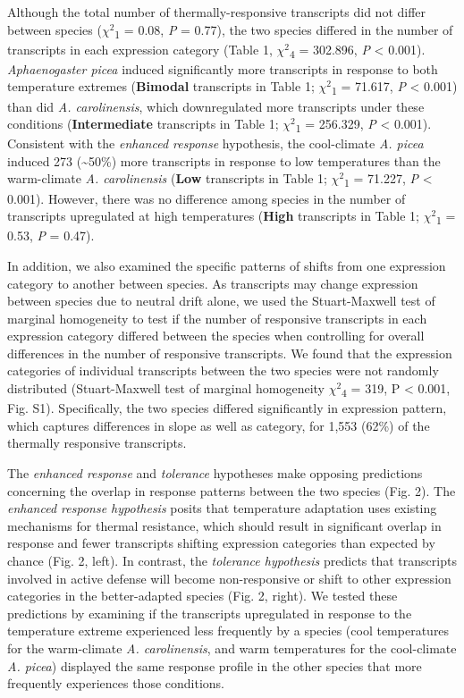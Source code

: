 \documentclass[]{article}
\begin{document}
Although the total number of thermally-responsive transcripts did not
differ between species (\(\chi^2\)\textsubscript{1} = 0.08, \emph{P} =
0.77), the two species differed in the number of transcripts in each
expression category (Table 1, \(\chi^2\)\textsubscript{4} = 302.896,
\emph{P} \textless{} 0.001). \emph{Aphaenogaster picea} induced
significantly more transcripts in response to both temperature extremes
(\textbf{Bimodal} transcripts in Table 1; \(\chi^2\)\textsubscript{1} =
71.617, \emph{P} \textless{} 0.001) than did \emph{A. carolinensis},
which downregulated more transcripts under these conditions
(\textbf{Intermediate} transcripts in Table 1;
\(\chi^2\)\textsubscript{1} = 256.329, \emph{P} \textless{} 0.001).
Consistent with the \emph{enhanced response} hypothesis, the
cool-climate \emph{A. picea} induced 273 (\textasciitilde{}50\%) more
transcripts in response to low temperatures than the warm-climate
\emph{A. carolinensis} (\textbf{Low} transcripts in Table 1;
\(\chi^2\)\textsubscript{1} = 71.227, \emph{P} \textless{} 0.001).
However, there was no difference among species in the number of
transcripts upregulated at high temperatures (\textbf{High} transcripts
in Table 1; \(\chi^2\)\textsubscript{1} = 0.53, \emph{P} = 0.47).

In addition, we also examined the specific patterns of shifts from one
expression category to another between species. As transcripts may
change expression between species due to neutral drift alone, we used
the Stuart-Maxwell test of marginal homogeneity to test if the number of
responsive transcripts in each expression category differed between the
species when controlling for overall differences in the number of
responsive transcripts. We found that the expression categories of
individual transcripts between the two species were not randomly
distributed (Stuart-Maxwell test of marginal homogeneity
\(\chi^2\)\textsubscript{4} = 319, P \textless{} 0.001, Fig. S1).
Specifically, the two species differed significantly in expression
pattern, which captures differences in slope as well as category, for
1,553 (62\%) of the thermally responsive transcripts.

The \emph{enhanced response} and \emph{tolerance} hypotheses make
opposing predictions concerning the overlap in response patterns between
the two species (Fig. 2). The \emph{enhanced response hypothesis} posits
that temperature adaptation uses existing mechanisms for thermal
resistance, which should result in significant overlap in response and
fewer transcripts shifting expression categories than expected by chance
(Fig. 2, left). In contrast, the \emph{tolerance hypothesis} predicts
that transcripts involved in active defense will become non-responsive
or shift to other expression categories in the better-adapted species
(Fig. 2, right). We tested these predictions by examining if the
transcripts upregulated in response to the temperature extreme
experienced less frequently by a species (cool temperatures for the
warm-climate \emph{A. carolinensis}, and warm temperatures for the
cool-climate \emph{A. picea}) displayed the same response profile in the
other species that more frequently experiences those conditions.
\end{document}
